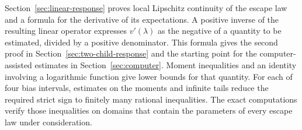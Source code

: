 Section~\ref{sec:linear-response} proves local Lipschitz continuity of the escape law and a formula for the derivative of its expectations. A positive inverse of the resulting linear operator expresses $v'(\lambda)$ as the negative of a quantity to be estimated, divided by a positive denominator. This formula gives the second proof in Section~\ref{sec:two-child-response} and the starting point for the computer-assisted estimates in Section~\ref{sec:computer}. Moment inequalities and an identity involving a logarithmic function give lower bounds for that quantity. For each of four bias intervals, estimates on the moments and infinite tails reduce the required strict sign to finitely many rational inequalities. The exact computations verify those inequalities on domains that contain the parameters of every escape law under consideration.
